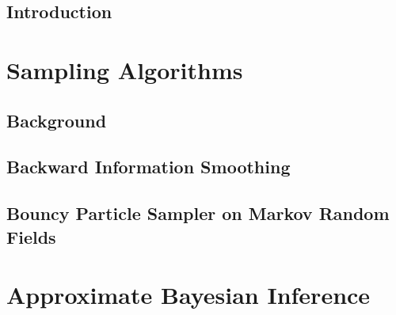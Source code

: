 
\singlespacing
\setcounter{tocdepth}{2}
\setcounter{secnumdepth}{2}
\iftoc\tableofcontents\fi

\cleardoublepage

\thispagestyle{empty}


\raggedbottom



\doublespacing


\chapter{Introduction}\setcounter{page}{1}

\ifintro\fi

\part{Sampling Algorithms} %

\chapter{\label{chap:BGsampling}Background}

\ifbgs\fi

\chapter{\label{chap:BIS}Backward Information Smoothing}

\iftfs\fi

\chapter{\label{chapBPSMRF}Bouncy Particle Sampler on Markov Random Fields}

\iflbps\fi

\part{Approximate Bayesian Inference} %

